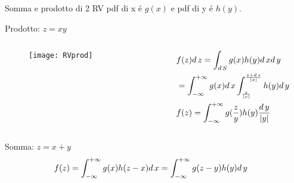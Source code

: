 \begin{wordonframe}{Somma e prodotto di 2 RV}
pdf di x \'e $g(x)$ e pdf di y \'e $h(y)$.
\begin{block}{Prodotto: $z=xy$}
	\begin{columns}[T]
		\begin{column}{0.3\textwidth}
			\begin{figure}
				\centering
				\texttt{[image: RVprod]}
				\label{fig:RVprod}
			\end{figure}
		\end{column}
		\begin{column}{0.7\textwidth}
			\begin{align*}
			&f(z)d\,z=\int_{d\,S}g(x)h(y)d\,xd\,y\\
			&=\int_{-\infty}^{+\infty}{}g(x)d\,x\int_{\frac{z}{|x|}}^{\frac{z+d\,s}{|x|}}h(y)d\,y\\
			&f(z)=\int_{-\infty}^{+\infty}{}g(\frac{z}{y})h(y)\frac{d\,y}{|y|}
			\end{align*}
		\end{column}
	\end{columns}
\end{block}
\begin{block}{Somma: $z=x+y$}
	\begin{align*}
	&f(z)=\int_{-\infty}^{+\infty}{}g(x)h(z-x)d\,x=\int_{-\infty}^{+\infty}{}g(z-y)h(y)d\,y
	\end{align*}
\end{block}
\end{wordonframe}

